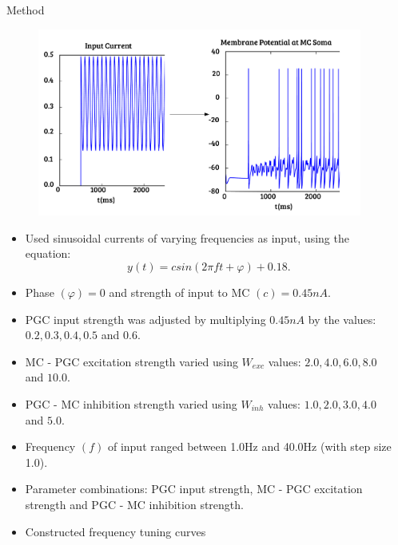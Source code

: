 \documentclass[final,hyperref={pdfpagelabels=false}]{beamer}
\begin{document}
\begin{frame}{}
\begin{columns}[t]
\begin{column}{.48\linewidth}
\begin{block}{Method} 
\begin{figure}
\center
\includegraphics[scale=1.2]{images/Figure2}
\end{figure}
\begin{itemize}
\item Used sinusoidal currents of varying frequencies as input, using the equation:
\begin{equation}
y(t) = csin(2 \pi ft + \varphi) + 0.18. 
\end{equation}
\item Phase $(\varphi) = 0$ and strength of input to MC $(c) = 0.45nA$.
\item PGC input strength was adjusted by multiplying $0.45nA$ by the values: $0.2, 0.3, 0.4, 0.5$ and $0.6$.
\item MC - PGC excitation strength varied using $W_{exc}$ values: $2.0, 4.0, 6.0, 8.0$ and $10.0$.
\item PGC - MC inhibition strength varied using $W_{inh}$ values: $1.0, 2.0, 3.0, 4.0$ and $5.0$.
\item Frequency $(f)$ of input ranged between 1.0Hz and 40.0Hz (with step size 1.0).
\item Parameter combinations: PGC input strength, MC - PGC excitation strength and PGC - MC inhibition strength.
\item Constructed frequency tuning curves
\end{itemize}
\end{block}

\end{column}
\begin{column}{.48\linewidth}


\end{column}
\end{columns}
\end{frame}
\end{document}
